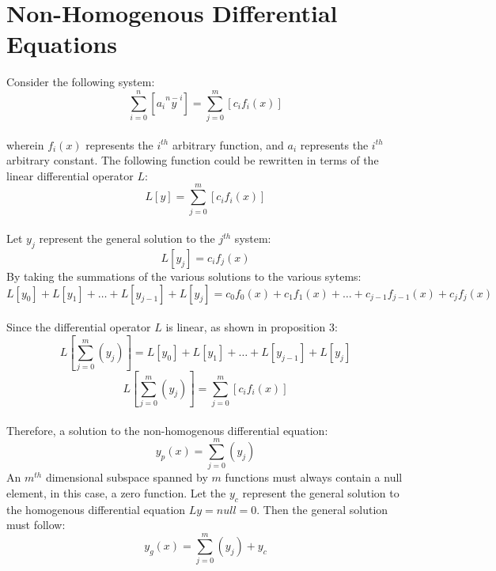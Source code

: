 \section{Non-Homogenous Differential Equations}
\begin{comment}
\end{comment}
Consider the following system:
$$\sum_{i = 0}^{n}\left[a_i \overset{n - i}{y}\right] = \sum_{j = 0}^{m}\left[c_i f_i(x)\right]$$
\\wherein $f_i(x)$ represents the $i^{th}$ arbitrary function, and $a_i$ represents the $i^{th}$ arbitrary constant. The following function could be rewritten in terms of the linear differential operator $L$:
$$L[y] = \sum_{j = 0}^{m}\left[c_i f_i(x)\right]$$
\\Let $y_j$ represent the general solution to the $j^{th}$ system:
$$L[y_j] = c_i f_j(x)$$
By taking the summations of the various solutions to the various sytems:
$$L[y_0] + L[y_1] + \dots +L[y_{j - 1}] + L[y_j] = c_0 f_0(x) + c_1 f_1(x) + \dots + c_{j - 1} f_{j - 1}(x) + c_{j} f_j(x)$$
\\Since the differential operator $L$ is linear, as shown in proposition 3: 
$$L\left[\sum_{j = 0}^{m}\left(y_j\right)\right] = L[y_0] + L[y_1] + \dots +L[y_{j - 1}] + L[y_j]$$
$$L\left[\sum_{j = 0}^{m}\left(y_j\right)\right] =  \sum_{j = 0}^{m}\left[c_i f_i(x)\right] $$
\\Therefore, a solution to the non-homogenous differential equation:
$$y_p(x) = \sum_{j = 0}^{m}\left(y_j\right)$$ 
An $m^{th}$ dimensional subspace spanned by $m$ functions must always contain a null element, in this case, a zero function. Let the $y_c$ represent the general solution to the homogenous differential equation $Ly = null = 0$. Then the general solution must follow:
$$y_g(x) = \sum_{j = 0}^{m}\left(y_j\right) + y_c$$
